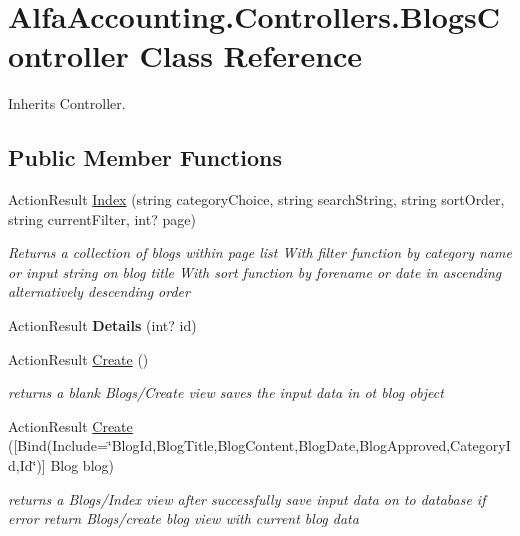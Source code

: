 \hypertarget{class_alfa_accounting_1_1_controllers_1_1_blogs_controller}{}\section{Alfa\+Accounting.\+Controllers.\+Blogs\+Controller Class Reference}
\label{class_alfa_accounting_1_1_controllers_1_1_blogs_controller}


Inherits Controller.

\subsection*{Public Member Functions}
\begin{DoxyCompactItemize}
\item 
Action\+Result \hyperlink{class_alfa_accounting_1_1_controllers_1_1_blogs_controller_a74802933bb006f192322f5c95aa52977}{Index} (string category\+Choice, string search\+String, string sort\+Order, string current\+Filter, int? page)
\begin{DoxyCompactList}\small\item\em Returns a collection of blogs within page list With filter function by category name or input string on blog title With sort function by forename or date in ascending alternatively descending order \end{DoxyCompactList}\item 
\mbox{\label{class_alfa_accounting_1_1_controllers_1_1_blogs_controller_a403d27c3a759fd9c09d31e9d008773c8}} 
Action\+Result {\bfseries Details} (int? id)
\item 
Action\+Result \hyperlink{class_alfa_accounting_1_1_controllers_1_1_blogs_controller_add17e68e465717e073580dac6b541e07}{Create} ()
\begin{DoxyCompactList}\small\item\em returns a blank Blogs/\+Create view saves the input data in ot blog object \end{DoxyCompactList}\item 
Action\+Result \hyperlink{class_alfa_accounting_1_1_controllers_1_1_blogs_controller_a78c98056cc7864ecf6526c64c314e5ba}{Create} (\mbox{[}Bind(Include=\char`\"{}Blog\+Id,Blog\+Title,Blog\+Content,Blog\+Date,Blog\+Approved,Category\+Id,Id\char`\"{})\mbox{]} Blog blog)
\begin{DoxyCompactList}\small\item\em returns a Blogs/\+Index view after successfully save input data on to database if error return Blogs/create blog view with current blog data \end{DoxyCompactList}\item 

\end{DoxyCompactItemize}
